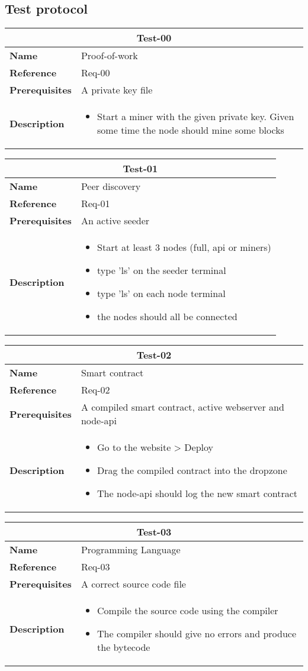 \documentclass[../documentation.tex]{subfiles}
\begin{document}
\newcommand{\requirement}[5]{
    \bgroup{}
    \def\arraystretch{1.25}
    \begin{center}
        \begin{tabular}{ |l|p{9cm}| }
            \hline
            \multicolumn{2}{|c|}{\textbf{Test-#1}} \\
            \hline
            \textbf{Name} & #2 \\
            \hline
            \textbf{Reference} & #3 \\
            \hline
            \textbf{Prerequisites} & #4 \\
            \hline
            \textbf{Description} &
            \begin{itemize}
                #5
            \end{itemize} \\
            \hline
        \end{tabular}
    \end{center}
    \egroup{}
}

\subsection{Test protocol}

\requirement{00}
    {Proof-of-work}
    {Req-00}
    {A private key file}
    {\item Start a miner with the given private key. Given some time
    the node should mine some blocks}

\requirement{01}
    {Peer discovery}
    {Req-01}
    {An active seeder}
    {
        \item Start at least 3 nodes (full, api or miners)
        \item type 'ls' on the seeder terminal
        \item type 'ls' on each node terminal
        \item the nodes should all be connected 
    }

\requirement{02}
    {Smart contract}
    {Req-02}
    {A compiled smart contract, active webserver and node-api}
    {
        \item Go to the website > Deploy
        \item Drag the compiled contract into the dropzone
        \item The node-api should log the new smart contract
    }

\requirement{03}
    {Programming Language}
    {Req-03}
    {A correct source code file}
    {
        \item Compile the source code using the compiler
        \item The compiler should give no errors and produce the bytecode
    }
\end{document}
